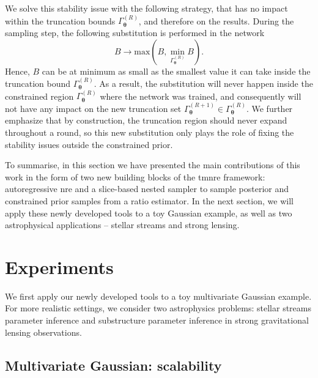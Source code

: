 We solve this stability issue with the following strategy, that has no impact within the truncation bounds $\Gamma^{(R)}_{\boldsymbol{\theta}}$, and therefore on the results.
During the sampling step, the following substitution is performed in the network
\begin{equation}
    B \rightarrow \text{max}(B, \min_{\Gamma^{(R)}_{\boldsymbol{\theta}}}B). 
\end{equation}
Hence, $B$ can be at minimum as small as the smallest value it can take inside the truncation bound $\Gamma^{(R)}_{\boldsymbol{\theta}}$. As a result, the substitution will never happen inside the constrained region $\Gamma^{(R)}_{\boldsymbol{\theta}}$ where the network was trained, and consequently will not have any impact on the new truncation set $\Gamma^{(R+1)}_{\boldsymbol{\theta}} \in \Gamma^{(R)}_{\boldsymbol{\theta}}$. We further emphasize that by construction, the truncation region should never expand throughout a round, so this new substitution only plays the role of fixing the stability issues outside the constrained prior.


\vspace{10pt}
 To summarise, in this section we have presented the main contributions of this work in the form of two new building blocks of the \gls*{tmnre} framework: autoregressive \gls*{nre} and a slice-based nested sampler to sample posterior and constrained prior samples from a ratio estimator. In the next section, we will apply these newly developed tools to a toy Gaussian example, as well as two astrophysical applications -- stellar streams and strong lensing.


\section{Experiments} \label{sec:anre-experiments}

 We first apply our newly developed tools to a toy multivariate Gaussian example. For more realistic settings, we consider two astrophysics problems: stellar streams parameter inference and substructure parameter inference in strong gravitational lensing observations.

\subsection{Multivariate Gaussian: scalability} \label{toy}

